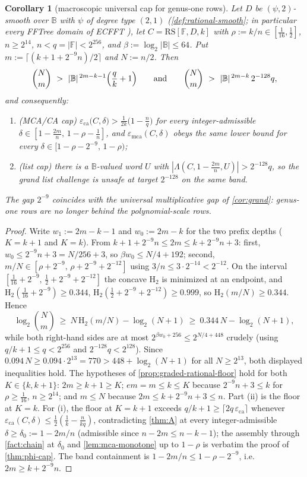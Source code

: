 \documentclass[11pt]{article}
\newtheorem{corollary}[corollary]{Corollary}
\theoremstyle{definition}
\theoremstyle{remark}
\newcommand{\F}{\mathbb{F}}
\newcommand{\B}{\mathbb{B}}
\newcommand{\RS}{\mathrm{RS}}
\newcommand{\eca}{\varepsilon_{\mathrm{ca}}}
\newcommand{\emca}{\varepsilon_{\mathrm{mca}}}
\newcommand{\Lst}{\Lambda}
\newcommand{\Hb}{\mathrm{H}_2}
\begin{document}
\begin{corollary}[macroscopic universal cap for genus-one rows]\label{cor:ecfft-macroscopic}
Let $D$ be $(\psi,2)$-smooth over $\B$ with $\psi$ of degree type $(2,1)$ \textup(\cref{def:rational-smooth}; in particular every FFTree domain of ECFFT \cite{BCKL21}\textup), let $C=\RS[\F,D,k]$ with $\rho:=k/n\in[\tfrac1{16},\tfrac12]$, $n\ge2^{14}$, $n<q=|\F|<2^{256}$, and $\beta:=\log_2|\B|\le64$. Put $m:=\lceil(k+1+2^{-9}n)/2\rceil$ and $N:=n/2$. Then
\[
\binom Nm\ >\ |\B|^{\,2m-k-1}\Bigl(\frac qk+1\Bigr)
\qquad\text{and}\qquad
\binom Nm\ >\ |\B|^{\,2m-k}\,2^{-128}q ,
\]
and consequently:
\begin{enumerate}[label=\textup{(\roman*)}]
\item \textup(MCA/CA cap\textup) $\eca\bigl(C,\delta\bigr)>\frac1{2k}\bigl(1-\frac nq\bigr)$ for every integer-admissible $\delta\in[1-\frac{2m}n,\,1-\rho-\frac1n]$, and $\emca(C,\delta)$ obeys the same lower bound for every $\delta\in[1-\rho-2^{-9},\,1-\rho)$;
\item \textup(list cap\textup) there is a $\B$-valued word $U$ with $|\Lst(C,1-\frac{2m}n,U)|>2^{-128}q$, so the grand list challenge is unsafe at target $2^{-128}$ on the same band.
\end{enumerate}
The gap $2^{-9}$ coincides with the universal multiplicative gap of \cref{cor:grand}: genus-one rows are no longer behind the polynomial-scale rows.
\end{corollary}

\begin{proof}
Write $w_1:=2m-k-1$ and $w_0:=2m-k$ for the two prefix depths ($K=k+1$ and $K=k$). From $k+1+2^{-9}n\le2m\le k+2^{-9}n+3$: first, $w_0\le2^{-9}n+3=N/256+3$, so $\beta w_0\le N/4+192$; second, $m/N\in[\rho+2^{-9},\,\rho+2^{-9}+2^{-12}]$ using $3/n\le3\cdot2^{-14}<2^{-12}$. On the interval $[\tfrac1{16}+2^{-9},\,\tfrac12+2^{-9}+2^{-12}]$ the concave $\Hb$ is minimized at an endpoint, and $\Hb(\tfrac1{16}+2^{-9})\ge0.344$, $\Hb(\tfrac12+2^{-9}+2^{-12})\ge0.999$, so $\Hb(m/N)\ge0.344$. Hence
\[
\log_2\binom Nm\ \ge\ N\,\Hb(m/N)-\log_2(N+1)\ \ge\ 0.344\,N-\log_2(N+1),
\]
while both right-hand sides are at most $2^{\beta w_0+256}\le2^{N/4+448}$ crudely \textup(using $q/k+1\le q<2^{256}$ and $2^{-128}q<2^{128}$\textup). Since $0.094\,N\ge0.094\cdot2^{13}=770>448+\log_2(N+1)$ for all $N\ge2^{13}$, both displayed inequalities hold. The hypotheses of \cref{prop:graded-rational-floor} hold for both $K\in\{k,k+1\}$: $2m\ge k+1\ge K$; $em=m\le k\le K$ because $2^{-9}n+3\le k$ for $\rho\ge\tfrac1{16}$, $n\ge2^{14}$; and $m\le N$ because $2m\le k+2^{-9}n+3\le n$. Part \textup{(ii)} is the floor at $K=k$. For \textup{(i)}, the floor at $K=k+1$ exceeds $q/k+1\ge\lceil2q\,\eca\rceil$ whenever $\eca(C,\delta)\le\frac12(\frac1k-\frac n{kq})$, contradicting \cref{thm:A} at every integer-admissible $\delta\ge\delta_0:=1-2m/n$ \textup(admissible since $n-2m\le n-k-1$\textup); the assembly through \cref{fact:chain} at $\delta_0$ and \cref{lem:mca-monotone} up to $1-\rho$ is verbatim the proof of \cref{thm:phi-cap}. The band containment is $1-2m/n\le1-\rho-2^{-9}$, i.e.\ $2m\ge k+2^{-9}n$.
\end{proof}
\end{document}
